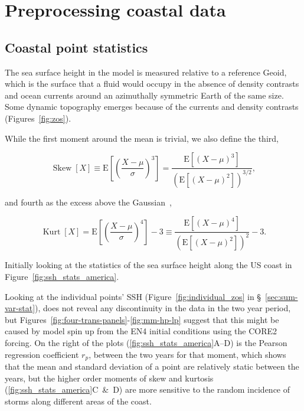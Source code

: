 \section{Preprocessing coastal data}
\subsection{Coastal point statistics}
The sea surface height in the model is measured relative to
a reference Geoid, which is the surface that a fluid would occupy
in the absence of density contrasts and ocean currents around an
azimuthally symmetric Earth of the same size.
Some dynamic topography emerges because of the
currents and density contrasts (Figures~\ref{fig:zos}).




While the first moment around the mean is trivial, we also define the third,

\begin{equation}
\operatorname{Skew}[X]\equiv \mathrm{E}\left[\left(\frac{X-\mu}{\sigma}\right)^{3}\right]
=\frac{\mathrm{E}\left[(X-\mu)^{3}\right]}{\left(\mathrm{E}\left[(X-\mu)^{2}\right]\right)^{3 / 2}},
\end{equation}

and fourth as the excess above the Gaussian~\cite{taleb2019statistical},

\begin{equation}
\operatorname{Kurt}[X]=
\mathrm{E}\left[\left(\frac{X-\mu}{\sigma}\right)^{4}\right]-3
\equiv \frac{\mathrm{E}\left[(X-\mu)^{4}\right]}{\left(\mathrm{E}\left[(X-\mu)^{2}\right]\right)^{2}}-3.
\end{equation}


Initially looking at the statistics of the sea surface height along the
US coast in Figure~\ref{fig:ssh_stats_america}.




Looking at the individual points' SSH (Figure~\ref{fig:individual_zos} in §~\ref{sec:sum-var-stat}),
does not reveal any discontinuity in the data in the two year period,
 but Figures~\ref{fig:four-trans-panels}-\ref{fig:mm-hp-lp}
suggest that this might be caused by model spin up from the
EN4 initial conditions using the CORE2 forcing.
On the right of the plots (\ref{fig:ssh_stats_america}A--D)
is the Pearson regression coefficient $r_p$,
between the two years for that moment, which shows that the mean and
standard deviation of a point are relatively static between the years, but the
higher order moments of skew and kurtosis
(\ref{fig:ssh_stats_america}C~\&~D) are more sensitive to the
random incidence of storms along different areas of the coast.





